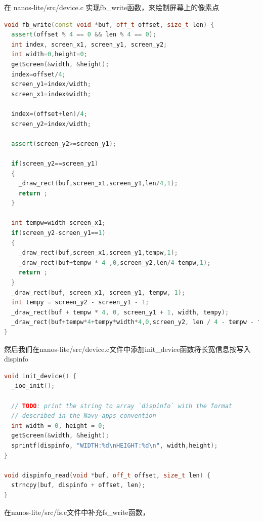 \documentclass[UTF8,a4paper,10pt]{ctexart}
\begin{document}
在 nanos-lite/src/device.c 实现fb\_write函数，来绘制屏幕上的像素点
\begin{lstlisting}[language = C++]
void fb_write(const void *buf, off_t offset, size_t len) {
  assert(offset % 4 == 0 && len % 4 == 0);
  int index, screen_x1, screen_y1, screen_y2;
  int width=0,height=0;
  getScreen(&width, &height);
  index=offset/4;
  screen_y1=index/width;
  screen_x1=index%width;

  index=(offset+len)/4;
  screen_y2=index/width;

  assert(screen_y2>=screen_y1);

  if(screen_y2==screen_y1)
  {
    _draw_rect(buf,screen_x1,screen_y1,len/4,1);
    return ;
  }

  int tempw=width-screen_x1;
  if(screen_y2-screen_y1==1)
  {
    _draw_rect(buf,screen_x1,screen_y1,tempw,1);
    _draw_rect(buf+tempw * 4 ,0,screen_y2,len/4-tempw,1);
    return ;
  }
  _draw_rect(buf, screen_x1, screen_y1, tempw, 1);
  int tempy = screen_y2 - screen_y1 - 1;
  _draw_rect(buf + tempw * 4, 0, screen_y1 + 1, width, tempy);
  _draw_rect(buf+tempw*4+tempy*width*4,0,screen_y2, len / 4 - tempw - tempy * width, 1);
}
\end{lstlisting}

然后我们在nanos-lite/src/device.c文件中添加init\_device函数将长宽信息按写入 dispinfo

\begin{lstlisting}[language = C++]
void init_device() {
  _ioe_init();

  // TODO: print the string to array `dispinfo` with the format
  // described in the Navy-apps convention
  int width = 0, height = 0;
  getScreen(&width, &height);
  sprintf(dispinfo, "WIDTH:%d\nHEIGHT:%d\n", width,height);
}

void dispinfo_read(void *buf, off_t offset, size_t len) {
  strncpy(buf, dispinfo + offset, len);
}
\end{lstlisting}

在nanos-lite/src/fs.c文件中补充fs\_write函数，
\end{document}
